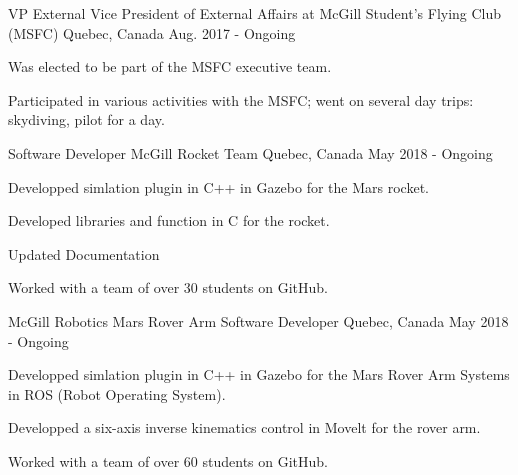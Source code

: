 
\begin{cventries}
\cventry
    {VP External}
    {Vice President of External Affairs at McGill Student's Flying Club (MSFC)}
    {Quebec, Canada}
    {Aug. 2017 - Ongoing}
    {
      \begin{cvitems}
        \item {Was elected to be part of the MSFC executive team.}
        \item {Participated in various activities with the MSFC; went on several day trips: skydiving, pilot for a day.}
      \end{cvitems}
    }    \newline

\cventry
    {Software Developer}
    {McGill Rocket Team}
    {Quebec, Canada}
    {May 2018 - Ongoing}
    {
      \begin{cvitems}
        \item {Developped simlation plugin in C++ in Gazebo for the Mars rocket.}
        \item {Developed libraries and function in C for the rocket.}
        \item {Updated Documentation}
        \item {Worked with a team of over 30 students on GitHub.}
      \end{cvitems}
    }    \newline

\cventry
    {McGill Robotics}
    {Mars Rover Arm Software Developer}
    {Quebec, Canada}
    {May 2018 - Ongoing}
    {
      \begin{cvitems}
        \item {Developped simlation plugin in C++ in Gazebo for the Mars Rover Arm Systems in ROS (Robot Operating System).}
        \item {Developped a six-axis inverse kinematics control in Movelt for the rover arm.}
        \item {Worked with a team of over 60 students on GitHub.}
      \end{cvitems}
    }    \newline

\end{cventries}
